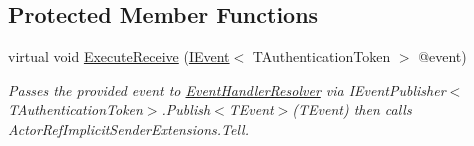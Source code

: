 \subsection*{Protected Member Functions}
\begin{DoxyCompactItemize}
\item 
virtual void \hyperlink{classCqrs_1_1Akka_1_1Events_1_1AkkaEventBusProxy_1_1BusActor_a90a6f4b440d2e2d9b997f6280ce67921_a90a6f4b440d2e2d9b997f6280ce67921}{Execute\+Receive} (\hyperlink{interfaceCqrs_1_1Events_1_1IEvent}{I\+Event}$<$ T\+Authentication\+Token $>$ @event)
\begin{DoxyCompactList}\small\item\em Passes the provided {\itshape event}  to \hyperlink{classCqrs_1_1Akka_1_1Events_1_1AkkaEventBusProxy_1_1BusActor_ae7986841b1bb97368936c52655b72f96_ae7986841b1bb97368936c52655b72f96}{Event\+Handler\+Resolver} via I\+Event\+Publisher$<$\+T\+Authentication\+Token$>$.\+Publish$<$\+T\+Event$>$(\+T\+Event) then calls Actor\+Ref\+Implicit\+Sender\+Extensions.\+Tell. \end{DoxyCompactList}\end{DoxyCompactItemize}
